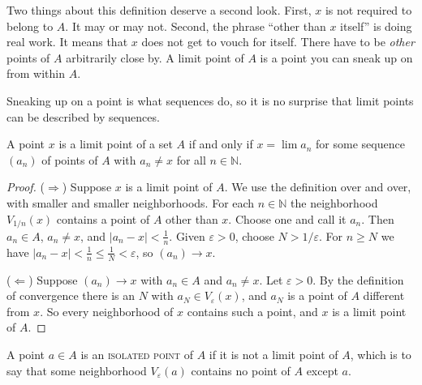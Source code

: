 Two things about this definition deserve a second look.  First, $x$ is not required to belong to $A$.  It may or may not.  Second, the phrase ``other than $x$ itself'' is doing real work.  It means that $x$ does not get to vouch for itself.  There have to be \emph{other} points of $A$ arbitrarily close by.  A limit point of $A$ is a point you can sneak up on from within $A$.

Sneaking up on a point is what sequences do, so it is no surprise that limit points can be described by sequences.

\begin{theorem}\label{thm:limit-point-sequence}
A point $x$ is a limit point of a set $A$ if and only if $x = \lim a_n$ for some sequence $(a_n)$ of points of $A$ with $a_n \neq x$ for all $n \in \mathbb{N}$.
\end{theorem}

\begin{proof}
($\Rightarrow$)  Suppose $x$ is a limit point of $A$.  We use the definition over and over, with smaller and smaller neighborhoods.  For each $n \in \mathbb{N}$ the neighborhood $V_{1/n}(x)$ contains a point of $A$ other than $x$.  Choose one and call it $a_n$.  Then $a_n \in A$, $a_n \neq x$, and $|a_n - x| < \frac{1}{n}$.  Given $\varepsilon > 0$, choose $N > 1/\varepsilon$.  For $n \geq N$ we have $|a_n - x| < \frac{1}{n} \leq \frac{1}{N} < \varepsilon$, so $(a_n) \to x$.

($\Leftarrow$)  Suppose $(a_n) \to x$ with $a_n \in A$ and $a_n \neq x$.  Let $\varepsilon > 0$.  By the definition of convergence there is an $N$ with $a_N \in V_{\varepsilon}(x)$, and $a_N$ is a point of $A$ different from $x$.  So every neighborhood of $x$ contains such a point, and $x$ is a limit point of $A$.
\end{proof}

\begin{definition}
A point $a \in A$ is an \textsc{isolated point} of $A$ if it is not a limit point of $A$, which is to say that some neighborhood $V_{\varepsilon}(a)$ contains no point of $A$ except $a$.
\end{definition}



